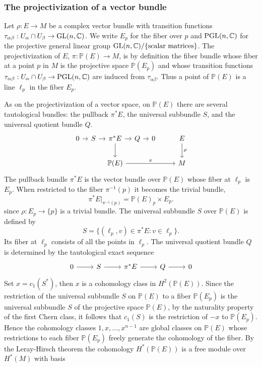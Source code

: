 \subsubsection{The projectivization of a vector bundle}
Let $\rho:E\to M$ be a complex vector bundle with transition functions $\tau_{\alpha\beta}:U_\alpha\cap U_\beta\to\mathrm{GL}(n,\mathbb{C})$. We write $E_p$ for the fiber over $p$ and 
$\mathrm{PGL}(n,\mathbb{C})$ for the projective general linear group $\mathrm{GL}(n,\mathbb{C})/\{\text{scalar matrices}\}$. The projectivization of $E$, $\pi:\mathbb{P}(E)\to M$, is by definition the 
fiber bundle whose fiber at a point $p$ in $M$ is the projective space $\mathbb{P}(E_p)$ and whose transition functions 
$\tau_{\alpha\beta}:U_{\alpha}\cap U_\beta\to\mathrm{PGL}(n,\mathbb{C})$ are induced from $\tau_{\alpha\beta}$. Thus a point of $\mathbb{P}(E)$ is a line $\ell_p$ in the fiber $E_p$.\par
As on the projectivization of a vector space, on $\mathbb{P}(E)$ there are several tautological bundles: the pullback $\pi^*E$, the universal subbundle $S$, and the 
universal quotient bundle $Q$.
\[\begin{tikzcd}[column sep=0.8em]
0\ar[r]&S\ar[r]&\pi^*E\ar[d]\ar[r]&Q\ar[r]&0&&&E\ar[d,"\rho"]\\
&&\mathbb{P}(E)\ar[rrrrr,"\pi"]&&&&&M
\end{tikzcd}\]
The pullback bundle $\pi^*E$ is the vector bundle over $\mathbb{P}(E)$ whose fiber at $\ell_p$ is $E_p$. When restricted to the fiber $\pi^{-1}(p)$ it becomes the 
trivial bundle,
\[\pi^*E|_{\pi^{-1}(p)}=\mathbb{P}(E)_p\times E_p.\]
since $\rho:E_p\to\{p\}$ is a trivial bundle. The universal subbundle $S$ over $\mathbb{P}(E)$ is defined by
\[S=\{(\ell_p,v)\in\pi^*E:v\in\ell_p\}.\]
Its fiber at $\ell_p$ consists of all the points in $\ell_p$. The universal quotient bundle $Q$ is determined by the tautological exact sequence
\[\begin{tikzcd}
0\ar[r]&S\ar[r]&\pi^*E\ar[r]&Q\ar[r]&0
\end{tikzcd}\]
Set $x=c_1(S^*)$, then $x$ is a cohomology class in $H^2(\mathbb{P}(E))$. Since the restriction of the universal subbundle $S$ on $\mathbb{P}(E)$ to a fiber 
$\mathbb{P}(E_p)$ is the universal subbundle $S$ of the projective space $\mathbb{P}(E)$, by the naturality property of the first Chern class, it follows that $c_1(S)$ 
is the restriction of $-x$ to $\mathbb{P}(E_p)$. Hence the cohomology classes $1,x,\dots,x^{n-1}$ are global classes on $\mathbb{P}(E)$ whose restrictions to each fiber 
$\mathbb{P}(E_p)$ freely generate the cohomology of the fiber. By the Leray-Hirsch theorem the cohomology $H^*(\mathbb{P}(E))$ is a free module over $H^*(M)$ with basis 
